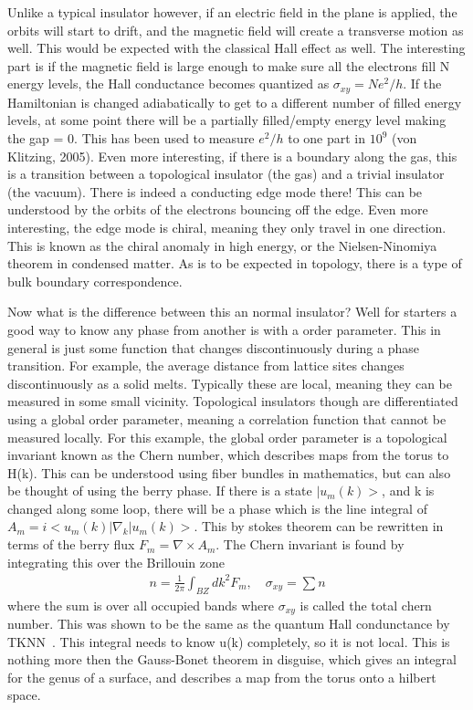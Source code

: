 Unlike a typical insulator however, if an electric field in the plane is applied, the orbits will start to drift, and the magnetic field will create a transverse motion as well. This would be expected with the classical Hall effect as well. The interesting part is if the magnetic field is large enough to make sure all the electrons fill N energy levels, the Hall conductance becomes quantized as $\sigma_{xy}=Ne^2/h$. If the Hamiltonian is changed adiabatically to get to a different number of filled energy levels, at some point there will be a partially filled/empty energy level making the gap = 0. This has been used to measure $e^2/h$ to one part
in $10^9$ (von Klitzing, 2005). Even more interesting, if there is a boundary along the gas, this is a transition between a topological insulator (the gas) and a trivial insulator (the vacuum). There is indeed a conducting edge mode there! This can be understood by the orbits of the electrons bouncing off the edge. Even more interesting, the edge mode is chiral, meaning they only travel in one direction. This is known as the chiral anomaly in high energy, or the Nielsen-Ninomiya theorem in condensed matter. As is to be expected in topology, there is a type of bulk boundary correspondence.

Now what is the difference between this an normal insulator? Well for starters a good way to know any phase from another is with a order parameter. This in general is just some function that changes discontinuously during a phase transition. For example, the average distance from lattice sites changes discontinuously as a solid melts. Typically these are local, meaning they can be measured in some small vicinity. Topological insulators though are differentiated using a global order parameter, meaning a correlation function that cannot be measured locally. For this example, the global order parameter is a topological invariant known as the Chern number, which describes maps from the torus to H(k). This can be understood using fiber bundles in mathematics, but can also be thought of using the berry phase. If there is a state $|u_m(k)>$, and k is changed along some loop, there will be a phase which is the line integral of $A_m = i <u_m(k)|\nabla_k|u_m(k)>$. This by stokes theorem can be rewritten in terms of the berry flux $F_m=\nabla \times A_m$. The Chern invariant is found by integrating this over the Brillouin zone
\begin{align}
 n=\frac{1}{2\pi}\int_{BZ}dk^2 F_m, \quad \sigma_{xy}=\sum n
\end{align}
where the sum is over all occupied bands where $\sigma_{xy}$ is called the total chern number. This was shown to be the same as the quantum Hall condunctance by TKNN~\cite{TKNN}. This integral needs to know u(k) completely, so it is not local. This is nothing more then the Gauss-Bonet theorem in disguise, which gives an integral for the genus of a surface, and describes a map from the torus onto a hilbert space.

